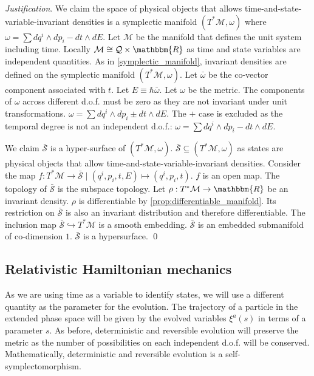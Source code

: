 \documentclass[aps,pra,10pt,twocolumn,floatfix,nofootinbib]{revtex4-1}
\numberwithin{equation}{section}
\theoremstyle{definition}
\newenvironment{justification}{\emph{Justification}.}{\qed}
\begin{document}
\begin{justification}
	We claim the space of physical objects that allows time-and-state-variable-invariant densities is a symplectic manifold $(T^*\mathcal{M}, \omega)$ where $\omega = \sum dq^i \wedge dp_i - dt \wedge dE$. Let $\mathcal{M}$ be the manifold that defines the unit system including time. Locally $\mathcal{M} \cong \mathcal{Q} \times \mathbbm{R}$ as time and state variables are independent quantities. As in \ref{symplectic_manifold}, invariant densities are defined on the symplectic manifold $(T^*\mathcal{M}, \omega)$. Let $\bar{\omega}$ be the co-vector component associated with $t$. Let $E\equiv\hbar \bar{\omega}$. Let $\omega$ be the metric. The components of $\omega$ across different d.o.f. must be zero as they are not invariant under unit transformations. $\omega=\sum dq^i \wedge dp_i \pm dt \wedge dE$. The $+$ case is excluded as the temporal degree is not an independent d.o.f.: $\omega = \sum dq^i \wedge dp_i - dt \wedge dE$.
	
	We claim $\bar{\mathcal{S}}$ is a hyper-surface of $(T^*\mathcal{M}, \omega)$. $\bar{\mathcal{S}} \subseteq (T^*\mathcal{M}, \omega)$ as states are physical objects that allow time-and-state-variable-invariant densities. Consider the map $f : T^*\mathcal{M} \rightarrow \bar{\mathcal{S}} \; | \; (q^i, p_i, t, E) \mapsto (q^i, p_i, t)$. $f$ is an open map. The topology of $\bar{\mathcal{S}}$ is the subspace topology. Let $\rho : T^*\mathcal{M} \rightarrow \mathbbm{R}$ be an invariant density. $\rho$ is differentiable by \ref{prop:differentiable_manifold}. Its restriction on $\bar{\mathcal{S}}$ is also an invariant distribution and therefore differentiable. The inclusion map $\bar{\mathcal{S}} \hookrightarrow T^*\mathcal{M}$ is a smooth embedding. $\bar{\mathcal{S}}$ is an embedded submanifold of co-dimension $1$. $\bar{\mathcal{S}}$ is a hypersurface.
\end{justification}


\subsection{Relativistic Hamiltonian mechanics}

As we are using time as a variable to identify states, we will use a different quantity as the parameter for the evolution. The trajectory of a particle in the extended phase space will be given by the evolved variables $\xi^a(s)$ in terms of a parameter $s$. As before, deterministic and reversible evolution will preserve the metric as the number of possibilities on each independent d.o.f. will be conserved. Mathematically, deterministic and reversible evolution is a self-symplectomorphism.
\end{document}
